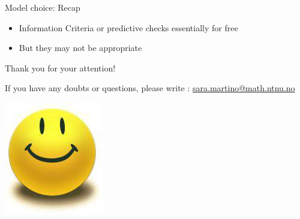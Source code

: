\documentclass[
  ignorenonframetext,
]{beamer}
\begin{document}
\begin{frame}{Model choice: Recap}
\protect\hypertarget{model-choice-recap}{}
\begin{itemize}
\item
  Information Criteria or predictive checks essentially for free
\item
  But they may not be appropriate
\end{itemize}
\end{frame}

\begin{frame}{}
\protect\hypertarget{section-10}{}
\Large

Thank you for your attention!

\normalsize

If you have any doubts or questions, please write :
\url{sara.martino@math.ntnu.no}

\begin{center}\includegraphics[width=0.3\linewidth]{graphics/smiley_small} \end{center}
\end{frame}
\end{document}

